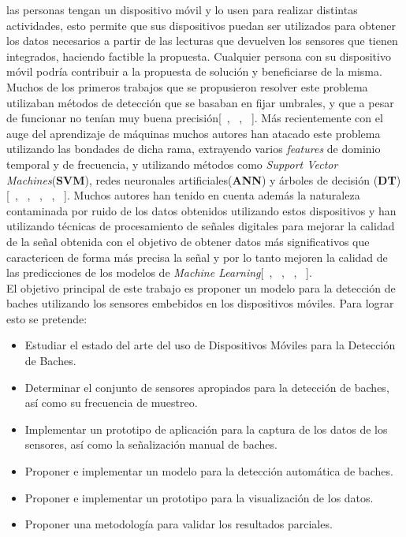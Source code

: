 las personas tengan un dispositivo móvil y lo usen para realizar distintas actividades, esto permite que sus dispositivos puedan ser utilizados
para obtener los datos necesarios a partir de las lecturas que devuelven los sensores que tienen integrados, haciendo factible la propuesta. 
Cualquier persona con su dispositivo móvil podría contribuir a la propuesta de solución y beneficiarse de la misma.\\
\indent Muchos de los primeros trabajos que se propusieron resolver este problema utilizaban métodos de detección que se basaban en fijar
umbrales, y que a pesar de funcionar no tenían muy buena precisión[~, ~,
~]. Más recientemente con el auge del aprendizaje de máquinas muchos autores han atacado este problema 
utilizando las bondades de dicha rama, extrayendo varios \emph{features} de dominio temporal y de frecuencia, y utilizando métodos
como \emph{Support Vector Machines}(\textbf{SVM}), redes neuronales artificiales(\textbf{ANN}) y árboles de decisión (\textbf{DT})
[~, ~, ~, ~,
~]. Muchos autores han tenido en cuenta además la naturaleza contaminada por ruido de los datos
obtenidos utilizando estos dispositivos y han utilizando técnicas de procesamiento de señales digitales para mejorar la calidad de
la señal obtenida con el objetivo de obtener datos más significativos que caractericen de forma más precisa la señal y por lo tanto mejoren la
calidad de las predicciones de los modelos de \emph{Machine Learning}[~, ~,
~, ~].\\
\indent El objetivo principal de este trabajo es proponer un modelo para la detección de baches utilizando los sensores embebidos en los
dispositivos móviles. Para lograr esto se pretende:

\begin{itemize}
	\item Estudiar el estado del arte del uso de Dispositivos Móviles para la Detección de Baches.
	\item Determinar el conjunto de sensores apropiados para la detección de baches, así como su frecuencia de muestreo.
	\item Implementar un prototipo de aplicación para la captura de los datos de los sensores, así como la señalización
		manual de baches.
	\item Proponer e implementar un modelo para la detección automática de baches.
	\item Proponer e implementar un prototipo para la visualización de los datos.
	\item Proponer una metodología para validar los resultados parciales.
\end{itemize}
